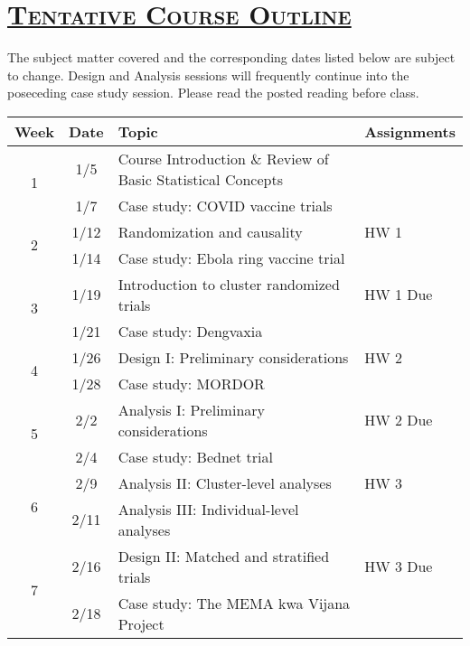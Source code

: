 \documentclass[fancyhdr,10pt]{article}
\begin{document}
\newpage
\section*{\underline{\textsc{Tentative Course Outline}}}
The subject matter covered and the corresponding dates listed below are subject to change. Design and Analysis sessions will frequently continue into the poseceding case study session.  Please read the posted reading before class.\\

\begin{center}
  \begin{tabular}{|c|c|m{3in}|l|}
    \hline
    Week                & Date  & Topic & Assignments \\\hline\hline
    \multirow{2}{*}{1}  & 1/5  & Course Introduction $\&$ Review of Basic Statistical Concepts &   \\\cline{2-4}
                        & 1/7  & Case study: COVID vaccine trials & \\\hline\hline
    \multirow{2}{*}{2}  & 1/12  & Randomization and causality &  HW 1  \\\cline{2-4}
                        & 1/14  & Case study: Ebola ring vaccine trial &\\\hline\hline
    \multirow{2}{*}{3}  & 1/19  & Introduction to cluster randomized trials & HW 1 Due \\\cline{2-4}
                        & 1/21  & Case study: Dengvaxia & \\\hline\hline
    \multirow{2}{*}{4}  & 1/26   & Design I: Preliminary considerations & HW 2  \\\cline{2-4}
                        & 1/28   & Case study: MORDOR &  \\\hline\hline
    \multirow{2}{*}{5}  & 2/2  &  Analysis I: Preliminary considerations &  HW 2 Due   \\\cline{2-4}
                        & 2/4  & Case study: Bednet trial &   \\\hline\hline
    \multirow{2}{*}{6}  & 2/9  & Analysis II: Cluster-level analyses & HW 3  \\\cline{2-4}
                        & 2/11  & Analysis III: Individual-level analyses &  \\\hline\hline
    \multirow{2}{*}{7}  & 2/16  & Design II: Matched and stratified trials & HW 3 Due \\\cline{2-4}
                        & 2/18  & Case study: The MEMA kwa Vijana Project &     \\\hline\hline

\end{tabular}
\end{center}
\end{document}
